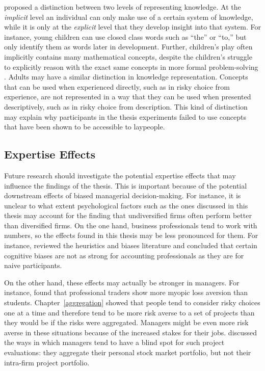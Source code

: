 \documentclass[a4paper, nobind]{templates/ociamthesis}
\theoremstyle{definition}
\theoremstyle{definition}
\theoremstyle{definition}
\theoremstyle{definition}
\theoremstyle{remark}
\begin{document}
\textcite{clark1993} proposed a distinction between two levels of representing knowledge.
At the \emph{implicit} level an individual can only make use of a certain system of
knowledge, while it is only at the \emph{explicit} level that they develop insight
into that system. For instance, young children can use closed class words such
as ``the'' or ``to,'' but only identify them as words later in development. Further,
children's play often implicitly contains many mathematical concepts, despite
the children's struggle to explicitly reason with the exact same concepts in
more formal problem-solving \autocite{sarama2009}. Adults may have a similar distinction
in knowledge representation. Concepts that can be used when experienced
directly, such as in risky choice from experience, are not represented in a way
that they can be used when presented descriptively, such as in risky choice from
description. This kind of distinction may explain why participants in the thesis
experiments failed to use concepts that have been shown to be accessible to
laypeople.

\subsection{Expertise Effects}

Future research should investigate the potential expertise effects that may
influence the findings of the thesis. This is important because of the potential
downstream effects of biased managerial decision-making. For instance, it is
unclear to what extent psychological factors such as the ones discussed in this
thesis may account for the finding that undiversified firms often perform better
than diversified firms. On the one hand, business professionals tend to work
with numbers, so the effects found in this thesis may be less pronounced for
them. For instance, \textcite{smith1991} reviewed the heuristics and biases literature and
concluded that certain cognitive biases are not as strong for accounting
professionals as they are for naive participants.

On the other hand, these effects may actually be stronger in managers. For
instance, \textcite{haigh2005} found that professional traders show more myopic loss
aversion than students. Chapter~\ref{aggregation} showed that people tend to
consider risky choices one at a time and therefore tend to be more risk averse
to a set of projects than they would be if the risks were aggregated. Managers
might be even more risk averse in these situations because of the increased
stakes for their jobs. \textcite{lovallo2020} discussed the ways in which managers tend to
have a blind spot for such project evaluations: they aggregate their personal
stock market portfolio, but not their intra-firm project portfolio.
\end{document}
